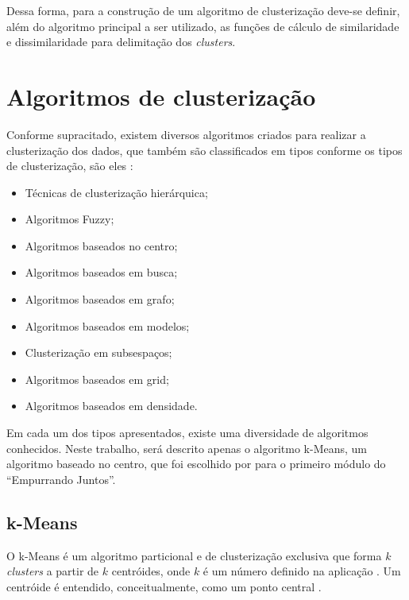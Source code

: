 Dessa forma, para a construção de um algoritmo de clusterização deve-se definir, além do algoritmo principal a ser utilizado, as funções
de cálculo de similaridade e dissimilaridade para delimitação dos \textit{clusters}.

\section{Algoritmos de clusterização}
Conforme supracitado, existem diversos algoritmos criados para realizar a clusterização dos dados, que também são classificados em tipos
conforme os tipos de clusterização, são eles \cite{gan2007data, han2011data, clustering_review}: 
% 

\begin{itemize}
 \item Técnicas de clusterização hierárquica;
 \item Algoritmos Fuzzy;
 \item Algoritmos baseados no centro;
 \item Algoritmos baseados em busca;
 \item Algoritmos baseados em grafo;
 \item Algoritmos baseados em modelos;
 \item Clusterização em subsespaços;
 \item Algoritmos baseados em grid;
 \item Algoritmos baseados em densidade.
\end{itemize}


Em cada um dos tipos apresentados, existe uma diversidade de algoritmos conhecidos. Neste trabalho, será descrito
apenas o algoritmo k-Means, um algoritmo baseado no centro, que foi escolhido por  
para o primeiro módulo do ``Empurrando Juntos''.

\subsection*{k-Means}
O k-Means é um algoritmo particional e de clusterização exclusiva que forma $k$ \textit{clusters} a partir de $k$ centróides, 
onde $k$ é um número definido na aplicação 
\cite{clustering_review, tan2013data}. Um centróide é entendido, conceitualmente, como um ponto central \cite{han2011data}.

